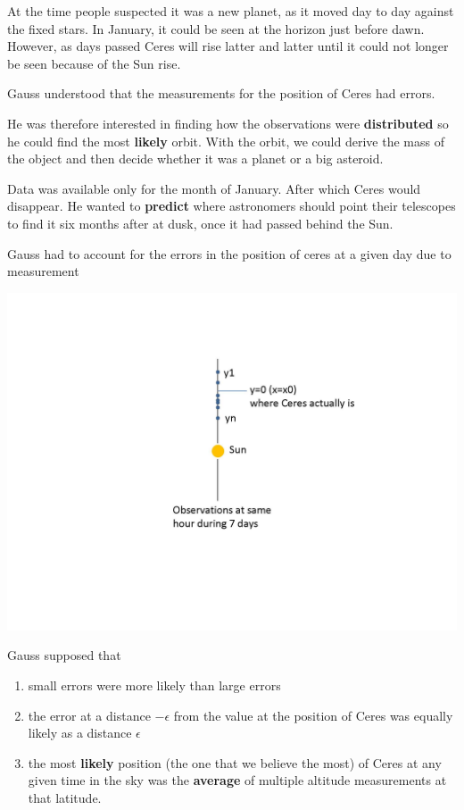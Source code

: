 \documentclass[
]{book}
\begin{document}
At the time people suspected it was a new planet, as it moved day to day against the fixed stars. In January, it could be seen at the horizon just before dawn. However, as days passed Ceres will rise latter and latter until it could not longer be seen because of the Sun rise.

Gauss understood that the measurements for the position of Ceres had errors.

He was therefore interested in finding how the observations were \textbf{distributed} so he could find the most \textbf{likely} orbit. With the orbit, we could derive the mass of the object and then decide whether it was a planet or a big asteroid.

Data was available only for the month of January. After which Ceres would disappear. He wanted to \textbf{predict} where astronomers should point their telescopes to find it six months after at dusk, once it had passed behind the Sun.

Gauss had to account for the errors in the position of ceres at a given day due to measurement

\includegraphics{./figures/ceres.JPG}

Gauss supposed that

\begin{enumerate}
\def\labelenumi{\arabic{enumi})}
\item
  small errors were more likely than large errors
\item
  the error at a distance \(-\epsilon\) from the value at the position of Ceres was equally likely as a distance \(\epsilon\)
\item
  the most \textbf{likely} position (the one that we believe the most) of Ceres at any given time in the sky was the \textbf{average} of multiple altitude measurements at that latitude.
\end{enumerate}
\end{document}
